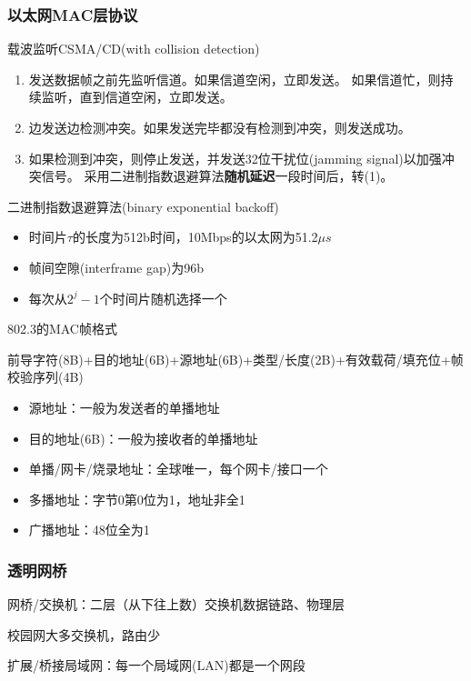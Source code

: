 \subsubsection{以太网MAC层协议}
载波监听CSMA/CD(with collision detection)
\begin{enumerate}
	\item 发送数据帧之前先监听信道。如果信道空闲，立即发送。
	如果信道忙，则持续监听，直到信道空闲，立即发送。
	\item 边发送边检测冲突。如果发送完毕都没有检测到冲突，则发送成功。
	\item 如果检测到冲突，则停止发送，并发送32位干扰位(jamming signal)以加强冲突信号。
	采用二进制指数退避算法\textbf{随机延迟}一段时间后，转(1)。
\end{enumerate}

二进制指数退避算法(binary exponential backoff)
\begin{itemize}
	\item 时间片$\tau$的长度为512b时间，10Mbps的以太网为51.2$\mu s$
	\item 帧间空隙(interframe gap)为96b
	\item 每次从$2^j-1$个时间片随机选择一个
\end{itemize}

802.3的MAC帧格式
\begin{center}
前导字符(8B)+目的地址(6B)+源地址(6B)+类型/长度(2B)+有效载荷/填充位+帧校验序列(4B)
\end{center}
\begin{itemize}
\item 源地址：一般为发送者的单播地址
\item 目的地址(6B)：一般为接收者的单播地址
\end{itemize}

\begin{itemize}
	\item 单播/网卡/烧录地址：全球唯一，每个网卡/接口一个
	\item 多播地址：字节0第0位为1，地址非全1
	\item 广播地址：48位全为1
\end{itemize}

\subsubsection{透明网桥}
网桥/交换机：二层（从下往上数）交换机数据链路、物理层

校园网大多交换机，路由少

扩展/桥接局域网：每一个局域网(LAN)都是一个网段

